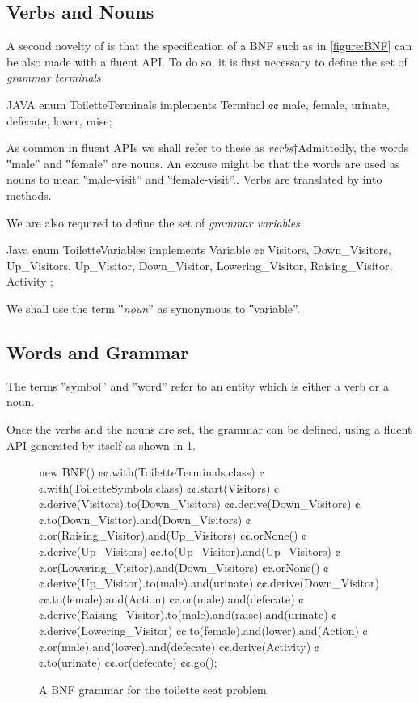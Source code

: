 \subsection{Verbs and Nouns}
A second novelty of \Self is that the specification of a BNF such as in
\cref{figure:BNF} can be also made with a \Java fluent API\@.
To do so, it is first necessary to
define the set of \emph{grammar terminals}
\begin{code}{JAVA}
enum ToiletteTerminals implements Terminal {¢¢
  male, female,
  urinate, defecate,
  lower, raise;
}
\end{code}
As common in fluent APIs we shall refer to these
as \emph{verbs}†{Admittedly, the words ‟male” and ‟female” are nouns.
An excuse might be that the words are used as nouns to mean ‟male-visit” and ‟female-visit”.}.
Verbs are translated by \Self into methods.

We are also required to define the set of \emph{grammar variables}
\begin{code}{Java}
enum ToiletteVariables implements Variable {¢¢
  Visitors, Down_Visitors, Up_Visitors,
  Up_Visitor, Down_Visitor,
  Lowering_Visitor, Raising_Visitor,
  Activity
};
\end{code}
We shall use the term ‟\emph{noun}” as synonymous to ‟variable”.

\subsection{Words and Grammar}
The terms ‟symbol” and ‟word” refer to an entity which is either
a verb or a noun.

Once the verbs and the nouns are set, the grammar can be defined,
using a fluent API generated by \Self itself as shown
in \cref{figure:fluent}.

\begin{figure}
  \begin{JAVA}[style=numbered]
new BNF()
  ¢¢.with(ToiletteTerminals.class)
  ¢¢.with(ToiletteSymbols.class)
  ¢¢.start(Visitors)
  ¢¢.derive(Visitors).to(Down_Visitors)
  ¢¢.derive(Down_Visitors)
    ¢¢.to(Down_Visitor).and(Down_Visitors)
    ¢¢.or(Raising_Visitor).and(Up_Visitors)
    ¢¢.orNone()
  ¢¢.derive(Up_Visitors)
    ¢¢.to(Up_Visitor).and(Up_Visitors)
    ¢¢.or(Lowering_Visitor).and(Down_Visitors)
    ¢¢.orNone()
  ¢¢.derive(Up_Visitor).to(male).and(urinate)
  ¢¢.derive(Down_Visitor)
    ¢¢.to(female).and(Action)
    ¢¢.or(male).and(defecate)
  ¢¢.derive(Raising_Visitor).to(male).and(raise).and(urinate)
  ¢¢.derive(Lowering_Visitor)
    ¢¢.to(female).and(lower).and(Action)
    ¢¢.or(male).and(lower).and(defecate)
  ¢¢.derive(Activity)
    ¢¢.to(urinate)
    ¢¢.or(defecate)
  ¢¢.go();
  \end{JAVA}
  \caption{A BNF grammar for the toilette seat problem}
  \label{figure:fluent}
\end{figure}

